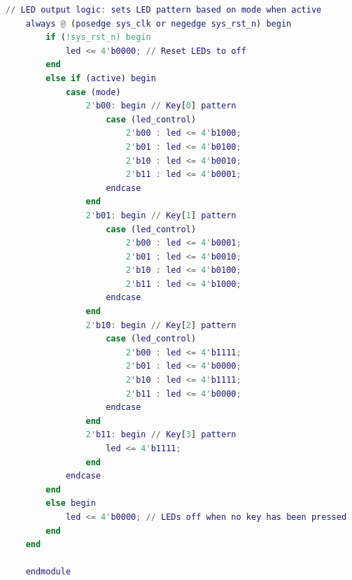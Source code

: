 \documentclass[UTF8]{article}
\theoremstyle{MyLineTheoremStyle} %
\theoremstyle{MyBlockTheoremStyle} %
\theoremstyle{MySubsubsectionStyle} %
\begin{document}
\begin{lstlisting}[language=Matlab, style=MatlabStyle_src]
    // LED output logic: sets LED pattern based on mode when active
    always @ (posedge sys_clk or negedge sys_rst_n) begin
        if (!sys_rst_n) begin
            led <= 4'b0000; // Reset LEDs to off
        end
        else if (active) begin
            case (mode)
                2'b00: begin // Key[0] pattern
                    case (led_control)
                        2'b00 : led <= 4'b1000;
                        2'b01 : led <= 4'b0100;
                        2'b10 : led <= 4'b0010;
                        2'b11 : led <= 4'b0001;
                    endcase
                end
                2'b01: begin // Key[1] pattern
                    case (led_control)
                        2'b00 : led <= 4'b0001;
                        2'b01 : led <= 4'b0010;
                        2'b10 : led <= 4'b0100;
                        2'b11 : led <= 4'b1000;
                    endcase
                end
                2'b10: begin // Key[2] pattern
                    case (led_control)
                        2'b00 : led <= 4'b1111;
                        2'b01 : led <= 4'b0000;
                        2'b10 : led <= 4'b1111;
                        2'b11 : led <= 4'b0000;
                    endcase
                end
                2'b11: begin // Key[3] pattern
                    led <= 4'b1111;
                end
            endcase
        end
        else begin
            led <= 4'b0000; // LEDs off when no key has been pressed
        end
    end
    
    endmodule
\end{lstlisting}
\end{document}
